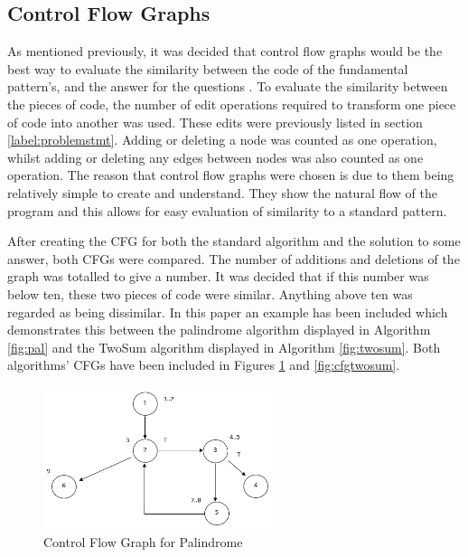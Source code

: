 \documentclass[10pt,twocolumn,hidelinks]{IEEEtran}
\begin{document}
\subsection{Control Flow Graphs}
\label{label:CFG}
As mentioned previously, it was decided that control flow graphs would be the best way to evaluate the similarity between the code of the fundamental pattern’s, and the answer for the questions \cite{softwaretesting}. To evaluate the similarity between the pieces of code, the number of edit operations required to transform one piece of code into another was used. These edits were previously listed in section \ref{label:problemstmt}. Adding or deleting a node was counted as one operation, whilst adding or deleting any edges between nodes was also counted as one operation. The reason that control flow graphs were chosen is due to them being relatively simple to create and understand. They show the natural flow of the program and this allows for easy evaluation of similarity to a standard pattern.
\par After creating the CFG for both the standard algorithm and the solution to some answer, both CFGs were compared. The number of additions and deletions of the graph was totalled to give a number. It was decided that if this number was below ten, these two pieces of code were similar. Anything above ten was regarded as being dissimilar. In this paper an example has been included which demonstrates this between the palindrome algorithm displayed in Algorithm \ref{fig:pal} and the TwoSum algorithm displayed in Algorithm \ref{fig:twosum}. Both algorithms' CFGs have been included in Figures \ref{fig:cfgpal} and \ref{fig:cfgtwosum}. 
 \begin{figure}[h]
\includegraphics[width=0.6\textwidth]{CFGPalindrome.png}
\caption{Control Flow Graph for Palindrome}
\label{fig:cfgpal}
\end{figure}
\end{document}

